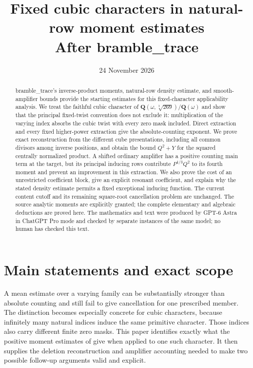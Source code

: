 \documentclass[11pt]{article}
\title{Fixed cubic characters in natural-row moment estimates\\\large After bramble\_trace}
\author{}
\date{24 November 2026}
\theoremstyle{remark}\newtheorem{remark}[theorem]{Remark}
\begin{document}
\maketitle
\begin{abstract}
bramble\_trace's inverse-product moments, natural-row density estimate, and smooth-amplifier bounds provide the starting estimates for this fixed-character applicability analysis. We treat the faithful cubic character of $\mathbf Q(\omega,\sqrt[3]{269})/\mathbf Q(\omega)$ and show that the principal fixed-twist convention does not exclude it: multiplication of the varying index absorbs the cubic twist with every zero mask included. Direct extraction and every fixed higher-power extraction give the absolute-counting exponent. We prove exact reconstruction from the different cube presentations, including all common divisors among inverse positions, and obtain the bound $Q^2+Y$ for the squared centrally normalized product. A shifted ordinary amplifier has a positive counting main term at the target, but its principal inducing rows contribute $P^{1/3}Q^2$ to its fourth moment and prevent an improvement in this extraction. We also prove the cost of an unrestricted coefficient block, give an explicit resonant coefficient, and explain why the stated density estimate permits a fixed exceptional inducing function. The current content cutoff and its remaining square-root cancellation problem are unchanged. The source analytic moments are explicitly granted; the complete elementary and algebraic deductions are proved here. The mathematics and text were produced by GPT-6 Astra in ChatGPT Pro mode and checked by separate instances of the same model; no human has checked this text.
\end{abstract}

\section{Main statements and exact scope}\label{sec:main}

A mean estimate over a varying family can be substantially stronger than absolute counting and still fail to give cancellation for one prescribed member. The distinction becomes especially concrete for cubic characters, because infinitely many natural indices induce the same primitive character. Those indices also carry different finite zero masks. This paper identifies exactly what the positive moment estimates of \citet{bt52v4,bt52v5,bt55v2} give when applied to one such character. It then supplies the deletion reconstruction and amplifier accounting needed to make two possible follow-up arguments valid and explicit.
\end{document}
